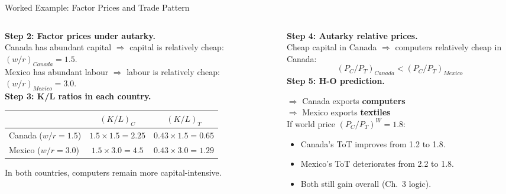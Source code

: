 \documentclass[aspectratio=169]{beamer}
\begin{document}
\begin{frame}[shrink=5]{Worked Example: Factor Prices and Trade Pattern}
\begin{columns}[T]
\begin{column}{0.50\textwidth}
\textbf{Step 2: Factor prices under autarky.}\\[0.3em]
Canada has abundant capital $\Rightarrow$ capital is
relatively cheap: $(w/r)_{Canada} = 1.5$.\\
Mexico has abundant labour $\Rightarrow$ labour is
relatively cheap: $(w/r)_{Mexico} = 3.0$.\\[0.4em]
\textbf{Step 3: K/L ratios in each country.}
\begin{center}
\begin{adjustbox}{max width=0.96\columnwidth}
\begin{tabular}{lcc}
\toprule
 & $(K/L)_C$ & $(K/L)_T$\\
\midrule
Canada ($w/r=1.5$) & $1.5\times1.5=2.25$ & $0.43\times1.5=0.65$\\
Mexico ($w/r=3.0$) & $1.5\times3.0=4.5$ & $0.43\times3.0=1.29$\\
\bottomrule
\end{tabular}
\end{adjustbox}
\end{center}
In both countries, computers remain more capital-intensive.
\end{column}
\begin{column}{0.47\textwidth}
\textbf{Step 4: Autarky relative prices.}\\[0.2em]
Cheap capital in Canada $\Rightarrow$ computers relatively
cheap in Canada:
\[(P_C/P_T)_{Canada} < (P_C/P_T)_{Mexico}\]
\textbf{Step 5: H-O prediction.}
\begin{varbox}
\small
$\Rightarrow$ Canada exports \textbf{computers}\\
$\Rightarrow$ Mexico exports \textbf{textiles}\\[0.3em]
If world price $(P_C/P_T)^W = 1.8$:\\
\begin{itemize}
  \item Canada's ToT improves from 1.2 to 1.8.
  \item Mexico's ToT deteriorates from 2.2 to 1.8.
  \item Both still gain overall (Ch.~3 logic).
\end{itemize}
\end{varbox}
\end{column}
\end{columns}
\end{frame}
\end{document}
